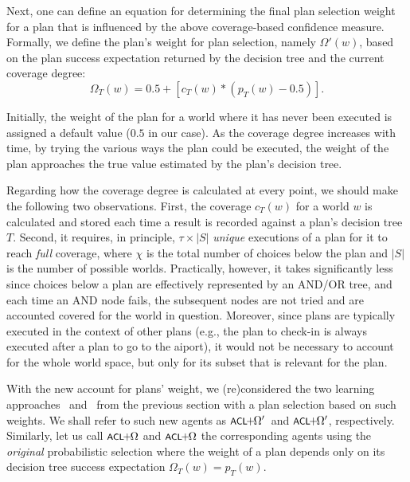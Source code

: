 Next,	 one can define an equation for determining the final plan selection
weight for a plan that is influenced by the above coverage-based confidence measure.
Formally, we define the plan's weight for plan selection, namely $\Omega'(w)$, based
on the plan success expectation returned by the decision tree and the current
coverage degree:
%
\begin{equation*}\label{eqn:coverage}   
\Omega_T(w) = 0.5 + \left[  c_T(w) *  \left( p_T(w) - 0.5 \right)  \right].
\end{equation*}
	
	
Initially, the weight of the plan for a world where it has never been executed is
assigned a default value ($0.5$ in our case).
As the coverage degree increases with time, by trying the various ways the plan
could be executed, the weight of the plan approaches the true value estimated by
the plan's decision tree.



Regarding how the coverage degree is calculated at every point, we should make
the following two observations.
First, the coverage $c_T(w)$ for a world $w$ is calculated and stored each time a
result is recorded against a plan's decision tree $T$.
Second, it requires, in principle, $\tau \times |S|$ \emph{unique} executions of
a plan for it to reach \emph{full} coverage, where $\chi$ is the total number of
choices below the plan and $|S|$ is the number of possible worlds. Practically,
however, it takes significantly less since choices below a plan are effectively
represented by an AND/OR tree, and each time an AND node fails, the subsequent
nodes are not tried and are accounted covered for the world in question.
Moreover, since plans are typically executed in the context of other plans
(e.g., the plan to check-in is always executed after a plan to go to the
aiport), it would not be necessary to account for the whole world space, but
only for its subset that is relevant for the plan.

\newcommand{\CLSELA}{\mbox{$\CL\!\!+\!\!\Omega$}}
\newcommand{\CLSELB}{\mbox{$\CL\!\!+\!\!\Omega'$}}
\newcommand{\BULSELA}{\mbox{$\CL\!\!+\!\!\Omega$}}
\newcommand{\BULSELB}{\mbox{$\CL\!\!+\!\!\Omega'$}}

\medskip With the new account for plans' weight, we (re)considered the two
learning approaches \CL\ and \BUL\ from the previous section with a plan
selection based on such weights. We shall refer to such new agents as \CLSELB\
and \BULSELB, respectively.
Similarly, let us call $\CLSELA$ and $\BULSELA$ the corresponding agents using
the \emph{original} probabilistic selection where the weight of a plan depends
only on its decision tree success expectation $\Omega_T(w) = p_T(w)$.



